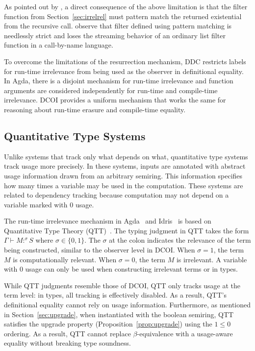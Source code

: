 \documentclass[acmsmall]{acmart}
\newcommand{\name}{DCOI\xspace}
\newcommand{\Name}{DCOI\xspace}
\begin{document}
As pointed out by \citet{choudhury:ddc}, a direct consequence of the above
limitation is that the \textsf{filter} function from
Section~\ref{sec:irrelrel} must pattern match the returned existential from
the recursive call. \citet{eisenberg:existentials} observe that
\textsf{filter} defined using pattern matching is needlessly strict and loses
the streaming behavior of an ordinary list filter function in a
call-by-name language.

To overcome the limitations of the resurrection mechanism, DDC restricts labels
for run-time irrelevance from being used as the observer in definitional
equality. In Agda, there is a disjoint mechanism for run-time irrelevance and
function arguments are considered independently for run-time and compile-time
irrelevance. \Name{} provides a uniform mechanism that works the same for
reasoning about run-time erasure and compile-time equality.


\subsection{Quantitative Type Systems}
Unlike systems that track only what depends on what, quantitative type systems
track usage more precisely. In these systems, inputs are
annotated with abstract usage information drawn from an arbitrary
semiring. This 
information specifies how many times a variable may be
used in the computation. These systems are related to dependency tracking because
computation may not depend on a variable marked with $0$ usage.

The run-time irrelevance mechanism in Agda~\citep{abel:icfp2020} and Idris~\citep{brady:idris2}
is based on Quantitative Type Theory (QTT)~\citep{mcbride2016got,atkey2018syntax}.
The typing judgment in QTT takes the form $\Gamma \vdash M:^\sigma S$
where $\sigma \in \{0,1\}$.
The $\sigma$ at the colon indicates the relevance of the term being
constructed, similar to the observer level in \name{}.
When $\sigma = 1$, the term $M$ is computationally relevant.
When $\sigma = 0$, the term $M$ is irrelevant.
A variable with $0$ usage can only be used when
constructing irrelevant terms or in types.

While QTT judgments resemble those of \name{}, QTT only tracks usage at the
term level: in types, all tracking is effectively disabled.  As a result,
QTT's definitional equality cannot rely on usage information.  Furthermore, as
mentioned in Section~\ref{sec:upgrade}, when instantiated with the boolean
semiring, QTT satisfies the upgrade property (Proposition~\ref{prop:upgrade})
using the $1 \leq 0$ ordering. As a result, QTT cannot replace
$\beta$-equivalence with a usage-aware equality without breaking type
soundness.
\end{document}
